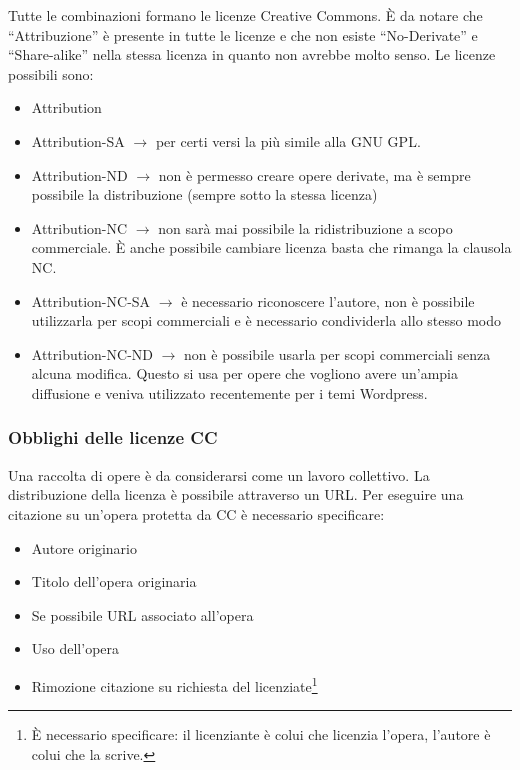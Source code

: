 Tutte le combinazioni formano le licenze Creative Commons. \`E da notare che ``Attribuzione'' \`e presente in tutte le licenze e che non esiste ``No-Derivate'' e ``Share-alike'' nella stessa licenza in quanto non avrebbe molto senso.
Le licenze possibili sono:
\begin{itemize}

\item Attribution
\item Attribution-SA $\to$ per certi versi la pi\`u simile alla GNU GPL.
\item Attribution-ND $\to$ non \`e permesso creare opere derivate, ma \`e sempre possibile la distribuzione (sempre sotto la stessa licenza)
\item Attribution-NC $\to$ non sar\`a mai possibile la ridistribuzione a scopo commerciale. \`E anche possibile cambiare licenza basta che rimanga la clausola NC.
\item Attribution-NC-SA $\to$ \`e necessario riconoscere l'autore, non \`e possibile utilizzarla per scopi commerciali e \`e necessario condividerla allo stesso modo
\item Attribution-NC-ND $\to$ non \`e possibile usarla per scopi commerciali senza alcuna modifica. Questo si usa per opere che vogliono avere un'ampia diffusione e veniva utilizzato recentemente per i temi Wordpress.

\end{itemize}

\subsubsection{Obblighi delle licenze CC}

Una raccolta di opere \`e da considerarsi come un lavoro collettivo. La distribuzione della licenza \`e possibile attraverso un URL. Per eseguire una citazione su un'opera protetta da CC \`e necessario specificare:
\begin{itemize}

\item Autore originario
\item Titolo dell'opera originaria
\item Se possibile URL associato all'opera
\item Uso dell'opera
\item Rimozione citazione su richiesta del licenziate\footnote{\`E necessario specificare: il licenziante \`e colui che licenzia l'opera, l'autore \`e colui che la scrive. }

\end{itemize}


